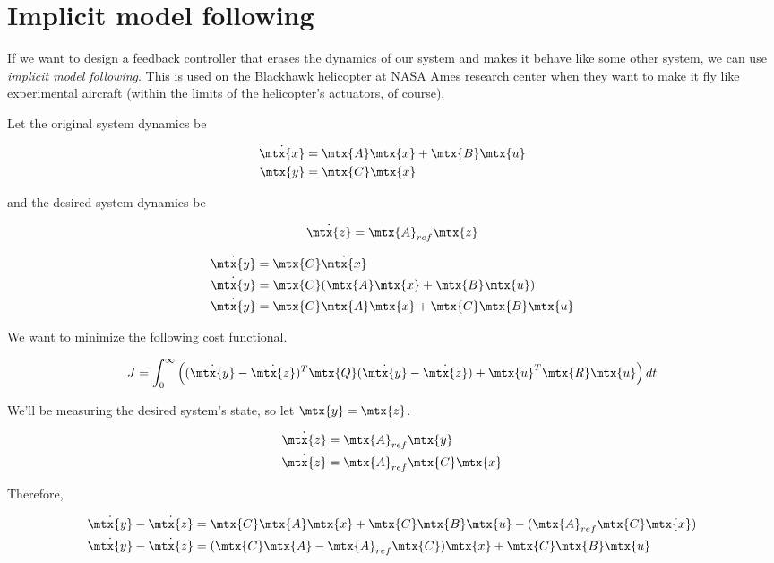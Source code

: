 \section{Implicit model following}
\label{sec:implicit_model_following}

If we want to design a feedback controller that erases the dynamics of our
system and makes it behave like some other system, we can use \textit{implicit
model following}. This is used on the Blackhawk helicopter at NASA Ames research
center when they want to make it fly like experimental aircraft (within the
limits of the helicopter's actuators, of course).

Let the original system dynamics be

\begin{align*}
  \dot{\mtx{x}} &= \mtx{A}\mtx{x} + \mtx{B}\mtx{u} \\
  \mtx{y} &= \mtx{C}\mtx{x}
\end{align*}

and the desired system dynamics be

\begin{equation*}
  \dot{\mtx{z}} = \mtx{A}_{ref}\mtx{z}
\end{equation*}

\begin{align*}
  \dot{\mtx{y}} &= \mtx{C}\dot{\mtx{x}} \\
  \dot{\mtx{y}} &= \mtx{C}(\mtx{A}\mtx{x} + \mtx{B}\mtx{u}) \\
  \dot{\mtx{y}} &= \mtx{C}\mtx{A}\mtx{x} + \mtx{C}\mtx{B}\mtx{u}
\end{align*}

We want to minimize the following cost functional.

\begin{equation*}
  J = \int_0^\infty \left((\dot{\mtx{y}} - \dot{\mtx{z}})^T \mtx{Q} (\dot{\mtx{y}} - \dot{\mtx{z}}) + \mtx{u}^T\mtx{R}\mtx{u}\right) dt
\end{equation*}

We'll be measuring the desired system's state, so let $\mtx{y} = \mtx{z}$.

\begin{align*}
  \dot{\mtx{z}} &= \mtx{A}_{ref}\mtx{y} \\
  \dot{\mtx{z}} &= \mtx{A}_{ref}\mtx{C}\mtx{x}
\end{align*}

Therefore,

\begin{align*}
  \dot{\mtx{y}} - \dot{\mtx{z}} &=
    \mtx{C}\mtx{A}\mtx{x} + \mtx{C}\mtx{B}\mtx{u} -
    (\mtx{A}_{ref}\mtx{C}\mtx{x}) \\
  \dot{\mtx{y}} - \dot{\mtx{z}} &=
    (\mtx{C}\mtx{A} - \mtx{A}_{ref}\mtx{C})\mtx{x} + \mtx{C}\mtx{B}\mtx{u}
\end{align*}


